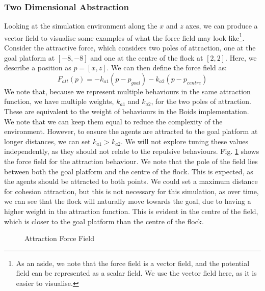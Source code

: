 \documentclass[12pt]{article}
\begin{document}
\subsubsection{Two Dimensional Abstraction}
Looking at the simulation environment along the $x$ and $z$ axes, we can produce a vector field to visualise some examples of what the force field may look like\footnote{As an aside, we note that the force field is a vector field, and the potential field can be represented as a scalar field. We use the vector field here, as it is easier to visualise.}. Consider the attractive force, which considers two poles of attraction, one at the goal platform at $[-8,-8]$ and one at the centre of the flock at $[2,2]$. Here, we describe a position as $p = [x,z]$. We can then define the force field as:
\begin{equation}
    F_{att}(p) = -k_{a1}(p-p_{goal}) - k_{a2}(p-p_{centre})
\end{equation}
We note that, because we represent multiple behaviours in the same attraction function, we have multiple weights, $k_{a1}$ and $k_{a2}$, for the two poles of attraction. These are equivalent to the weight of behaviours in the Boids implementation. We note that we can keep them equal to reduce the complexity of the environment. However, to ensure the agents are attracted to the goal platform at longer distances, we can set $k_{a1} > k_{a2}$. We will not explore tuning these values independently, as they should not relate to the repulsive behaviours. Fig. \ref{fig:force-field-att} shows the force field for the attraction behaviour. We note that the pole of the field lies between both the goal platform and the centre of the flock. This is expected, as the agents should be attracted to both points. We could set a maximum distance for cohesion attraction, but this is not necessary for this simulation, as over time, we can see that the flock will naturally move towards the goal, due to having a higher weight in the attraction function. This is evident in the centre of the field, which is closer to the goal platform than the centre of the flock.

\begin{figure}[ht]
    \centering
{}
    \caption{Attraction Force Field}
    \label{fig:force-field-att}
\end{figure}
\end{document}
